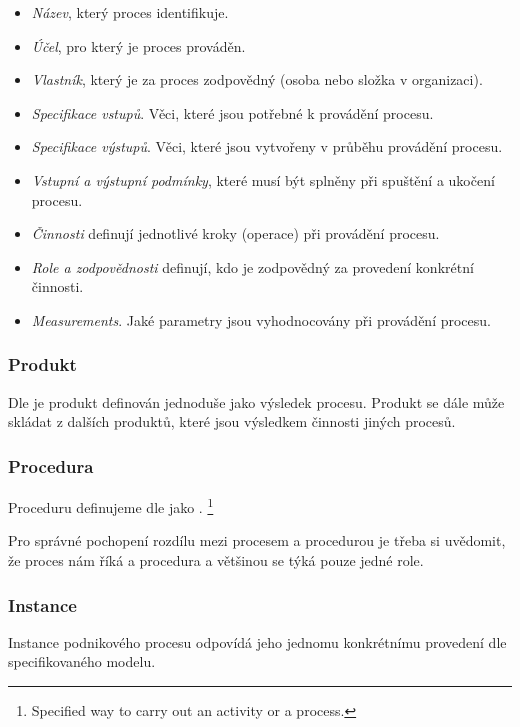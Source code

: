 \documentclass[]{article}
\begin{document}
\begin{itemize}
\item \textit{Název}, který proces identifikuje.
\item \textit{Účel}, pro který je proces prováděn.
\item \textit{Vlastník}, který je za proces zodpovědný (osoba nebo složka v organizaci).
\item \textit{Specifikace vstupů}. Věci, které jsou potřebné k provádění procesu.
\item \textit{Specifikace výstupů}. Věci, které jsou vytvořeny v průběhu provádění procesu.
\item \textit{Vstupní a výstupní podmínky}, které musí být splněny při spuštění a ukočení procesu.
\item \textit{Činnosti} definují jednotlivé kroky (operace) při provádění procesu.
\item \textit{Role a zodpovědnosti} definují, kdo je zodpovědný za provedení konkrétní činnosti.
\item \textit{Measurements}. Jaké parametry jsou vyhodnocovány při provádění procesu.
\end{itemize}

\subsubsection{Produkt}
Dle \cite{iso_9000} je produkt definován jednoduše jako výsledek procesu. Produkt se dále může skládat z dalších produktů, které jsou výsledkem činnosti jiných procesů.

\subsubsection{Procedura}
Proceduru definujeme dle \cite{iso_9000} jako \textit{}.
\footnote{Specified way to carry out an activity or a process.\cite{iso_9000}}

Pro správné pochopení rozdílu mezi procesem a procedurou je třeba si uvědomit, že proces nám říká  a procedura  a většinou se týká pouze jedné role. \cite{Bandor2007}

\subsubsection{Instance}
Instance podnikového procesu odpovídá jeho jednomu konkrétnímu provedení dle specifikovaného modelu.
\end{document}
